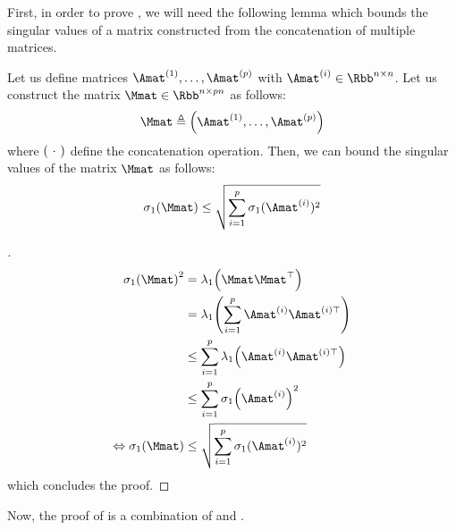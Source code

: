 First, in order to prove , we will need the following lemma which bounds the singular values of a matrix constructed from the concatenation of multiple matrices.
\begin{lemma} \label{theorem:ch2-bound_concatenation_matrices}
  Let us define matrices $\Amat^{(1)}, \dots, \Amat^{(p)}$ with $\Amat^{(i)} \in \Rbb^{n \times n}$. Let us construct the matrix $\Mmat \in \Rbb^{n \times pn}$ as follows:
  \begin{equation}
    \Mmat \triangleq \leftmat \Amat^{(1)}, \dots, \Amat^{(p)} \rightmat
  \end{equation}
  where $\leftmat\ \cdot\ \rightmat$ define the concatenation operation. Then, we can bound the singular values of the matrix $\Mmat$ as follows:
  \begin{equation}
    \sigma_1(\Mmat) \leq \sqrt{\sum_{i=1}^p \sigma_1(\Amat^{(i)})^2}
  \end{equation}
\end{lemma}

\begingroup
\allowdisplaybreaks
\addtolength{\jot}{1.5em}

\begin{proof}[]
  \begin{align}
    \sigma_1\left(\Mmat\right)^2 &= \lambda_1\left(\Mmat \Mmat^\top\right) \\
    &= \lambda_1\left( \sum_{i=1}^p\Amat^{(i)} \Amat^{(i)\top}  \right) \\
    &\leq \sum_{i=1}^p \lambda_1\left( \Amat^{(i)} \Amat^{(i)\top}  \right) \\
    &\leq \sum_{i=1}^p \sigma_1\left( \Amat^{(i)} \right)^2 \\
    \Leftrightarrow \sigma_1\left(\Mmat\right) &\leq \sqrt{\sum_{i=1}^p \sigma_1(\Amat^{(i)})^2}
  \end{align}
  which concludes the proof.
\end{proof}

\noindent
Now, the proof of  is a combination of  and .

